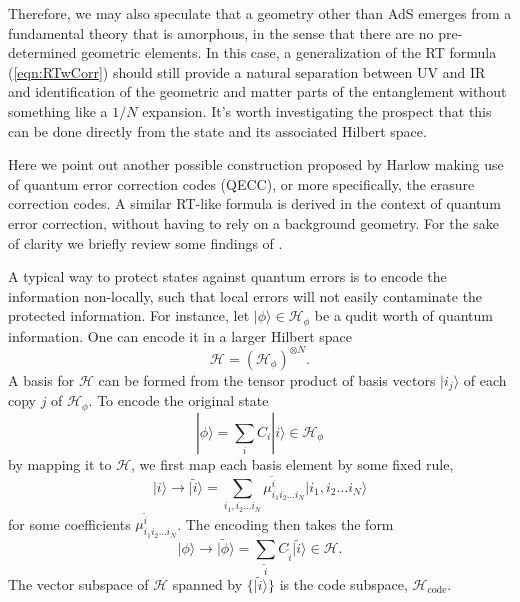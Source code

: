 \documentclass[%
12pt,preprint,
nofootinbib,
amsmath,amssymb,
aps,
prd,
showpacs,
superscriptaddress
]{revtex4-2}
\begin{document}
Therefore, we may also speculate that a geometry other than AdS emerges from a fundamental theory that is amorphous, in the sense that there are no pre-determined geometric elements. In this case, a generalization of the RT formula (\ref{eqn:RTwCorr}) should still provide a natural separation between UV and IR and identification of the geometric and matter parts of the entanglement without something like a $1/N$ expansion. 
It's worth investigating the prospect that this can be done directly from the state and its associated Hilbert space. 

Here we point out another possible construction proposed by Harlow \cite{Harlow:2016vwg} making use of quantum error correction codes (QECC), or more specifically, the erasure correction codes. A similar RT-like formula is derived in the context of quantum error correction, without having to rely on a background geometry. For the sake of clarity we briefly review some  findings of \cite{Harlow:2016vwg}.

A typical way to protect states against quantum errors is to encode the information non-locally, such that local errors will not easily contaminate the protected information. For instance, let  $|\phi\rangle\in \mathcal{H}_\phi$ be a qudit worth of quantum information. 
One can encode it in a larger Hilbert space
\begin{equation}
\mathcal{H} = (\mathcal{H}_\phi)^{\otimes N}.
\end{equation}
A basis for $\mathcal{H}$ can be formed from the tensor product of basis vectors $|i_j\rangle$ of each copy $j$ of $\mathcal{H}_\phi$. To encode the original state
\begin{equation}
|\phi\rangle = \sum_i C_i |i\rangle \in \mathcal{H}_\phi
\end{equation}
by mapping it to $\mathcal{H}$, we first map each basis element by some fixed rule,
\begin{equation}
  |i\rangle \rightarrow |\tilde i\rangle = \sum_{i_1, i_2 \dots i_N} \mu^{\tilde i}_{i_1i_2\dots i_N}|i_1, i_2 \dots i_N \rangle
\end{equation}
for some coefficients $\mu^{\tilde i}_{i_1i_2\dots i_N}$.
The encoding then takes the form
\begin{equation}
  |\phi\rangle \rightarrow  |\tilde{\phi}\rangle = \sum_{\tilde i} C_{\tilde i}|\tilde i \rangle\in\mathcal{H}.
\end{equation}
The vector subspace of $\mathcal{H}$ spanned by $\{|\tilde i\rangle\}$ is the code subspace, $\mathcal{H}_{\mathrm{code}}$.
\end{document}
